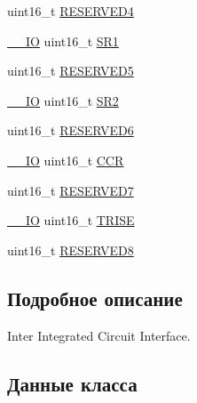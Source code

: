 \begin{DoxyCompactItemize}
\item 
uint16\+\_\+t \mbox{\hyperlink{struct_i2_c___type_def_a05a1a3482d9534ba9ef976e3277040f0}{R\+E\+S\+E\+R\+V\+E\+D4}}
\item 
\mbox{\hyperlink{group___c_m_s_i_s___c_m3__core__definitions_gaec43007d9998a0a0e01faede4133d6be}{\+\_\+\+\_\+\+IO}} uint16\+\_\+t \mbox{\hyperlink{struct_i2_c___type_def_ae1602cd1c9cad449523099c97138f991}{S\+R1}}
\item 
uint16\+\_\+t \mbox{\hyperlink{struct_i2_c___type_def_ae736412dcff4daa38bfa8bf8628df316}{R\+E\+S\+E\+R\+V\+E\+D5}}
\item 
\mbox{\hyperlink{group___c_m_s_i_s___c_m3__core__definitions_gaec43007d9998a0a0e01faede4133d6be}{\+\_\+\+\_\+\+IO}} uint16\+\_\+t \mbox{\hyperlink{struct_i2_c___type_def_a95c7f729b10eb2acafe499d9c9a81a83}{S\+R2}}
\item 
uint16\+\_\+t \mbox{\hyperlink{struct_i2_c___type_def_aaf1b319262f53669f49e244d94955a60}{R\+E\+S\+E\+R\+V\+E\+D6}}
\item 
\mbox{\hyperlink{group___c_m_s_i_s___c_m3__core__definitions_gaec43007d9998a0a0e01faede4133d6be}{\+\_\+\+\_\+\+IO}} uint16\+\_\+t \mbox{\hyperlink{struct_i2_c___type_def_a1775e779008da2b4d1807c2b5033b8a5}{C\+CR}}
\item 
uint16\+\_\+t \mbox{\hyperlink{struct_i2_c___type_def_a0f398bdcc3f24e7547c3cb9343111fd0}{R\+E\+S\+E\+R\+V\+E\+D7}}
\item 
\mbox{\hyperlink{group___c_m_s_i_s___c_m3__core__definitions_gaec43007d9998a0a0e01faede4133d6be}{\+\_\+\+\_\+\+IO}} uint16\+\_\+t \mbox{\hyperlink{struct_i2_c___type_def_aaba7a808e4dfae5cc06b197c298af206}{T\+R\+I\+SE}}
\item 
uint16\+\_\+t \mbox{\hyperlink{struct_i2_c___type_def_a6e762751c9d5a1e41efb6033a26d8ed8}{R\+E\+S\+E\+R\+V\+E\+D8}}
\end{DoxyCompactItemize}


\subsection{Подробное описание}
Inter Integrated Circuit Interface. 

\subsection{Данные класса}
\mbox{\label{struct_i2_c___type_def_a1775e779008da2b4d1807c2b5033b8a5}} 
